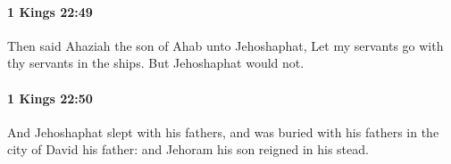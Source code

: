 		\paragraph{1 Kings 22:49} %
			\label{1KINGS-22-49}

			Then said Ahaziah the son of Ahab unto Jehoshaphat, Let my servants go with thy servants in the ships. But Jehoshaphat would not.


		\paragraph{1 Kings 22:50} %
			\label{1KINGS-22-50}

			And Jehoshaphat slept with his fathers, and was buried with his fathers in the city of David his father: and Jehoram his son reigned in his stead.


